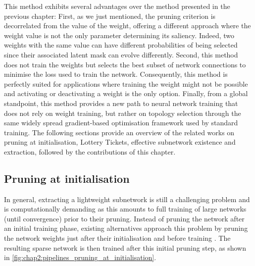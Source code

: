 This method exhibits several advantages over the method presented in the
previous chapter: First, as we just mentioned, the pruning criterion is
decorrelated from the value of the weight, offering a different approach where
the weight value is not the only parameter determining its saliency. Indeed, two
weights with the same value can have different probabilities of being selected
since their associated latent mask can evolve differently. Second, this method
does not train the weights but selects the best subset of network connections to
minimise the loss used to train the network. Consequently, this method is
perfectly suited for applications where training the weight might not be
possible and activating or deactivating a weight is the only option. Finally,
from a global standpoint, this method provides a new path to neural network
training that does not rely on weight training, but rather on topology selection
through the same widely spread gradient-based optimisation framework used by
standard training. The following sections provide an overview of the related
works on pruning at initialisation, Lottery Tickets, effective subnetwork
existence and extraction, followed by the contributions of this chapter.\\




\subsection{Pruning at initialisation} 

In general, extracting a lightweight subnetwork is still a challenging problem
\cite{frankle2020pruning} and is computationally demanding as this amounts to
full training of large networks (until convergence) prior to their pruning.
Instead of pruning the network after an initial training phase, existing
alternatives approach this problem by pruning the network weights just after
their initialisation and before training
\cite{DBLP:conf/iclr/LeeAT19,DBLP:conf/iclr/WangZG20,DBLP:conf/nips/TanakaKYG20}.
The resulting sparse network is then trained after this initial pruning step, as
shown in \cref{fig:chap2:pipelines_pruning_at_initialisation}.\\

